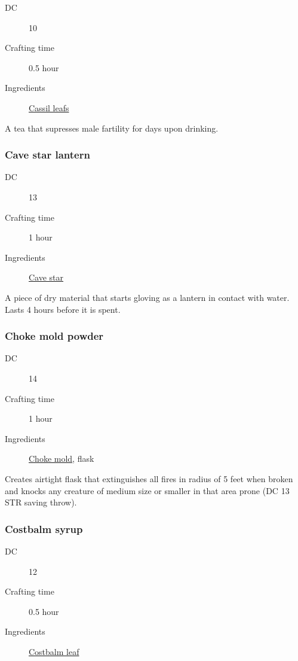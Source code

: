\begin{description}
\item [DC] 10
\item [Crafting time] 0.5 hour
\item [Ingredients] \hyperref[Cassil]{Cassil leafs}
\end{description}

A tea that supresses male fartility for  days upon drinking.

\subsubsection{Cave star lantern}
\label{Cave star lantern}

\begin{description}
\item [DC] 13
\item [Crafting time] 1 hour
\item [Ingredients] \hyperref[Cave star]{Cave star}
\end{description}

A piece of dry material that starts gloving as a lantern in contact with water. Lasts 4 hours before it is spent.

\subsubsection{Choke mold powder}
\label{Choke mold powder}

\begin{description}
\item [DC] 14
\item [Crafting time] 1 hour
\item [Ingredients] \hyperref[Choke Mold]{Choke mold}, flask
\end{description}

Creates airtight flask that extinguishes all fires in radius of 5 feet when broken and knocks any creature of medium size or smaller in that area prone (DC 13 STR saving throw).

\subsubsection{Costbalm syrup}
\label{Costbalm syrup}

\begin{description}
\item [DC] 12
\item [Crafting time] 0.5 hour
\item [Ingredients] \hyperref[Cotsbalm]{Costbalm leaf}
\end{description}

